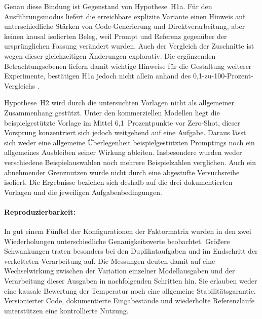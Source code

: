 Genau diese Bindung ist Gegenstand von Hypothese~H1a. Für den Ausführungsmodus liefert die erreichbare explizite Variante einen Hinweis auf unterschiedliche Stärken von Code-Generierung und Direktverarbeitung, aber keinen kausal isolierten Beleg, weil Prompt und Referenz gegenüber der ursprünglichen Fassung verändert wurden. Auch der Vergleich der Zuschnitte ist wegen dieser gleichzeitigen Änderungen explorativ. Die ergänzenden Betrachtungsebenen liefern damit wichtige Hinweise für die Gestaltung weiterer Experimente, bestätigen H1a jedoch nicht allein anhand des 0,1-zu-100-Prozent-Vergleichs \autocite{khanOverviewETLTechniques2024,walhaDataIntegrationTraditional2024}.

Hypothese~H2 wird durch die untersuchten Vorlagen nicht als allgemeiner Zusammenhang gestützt. Unter den kommerziellen Modellen liegt die beispielgestützte Vorlage im Mittel 6,1~Prozentpunkte vor Zero-Shot, dieser Vorsprung konzentriert sich jedoch weitgehend auf eine Aufgabe. Daraus lässt sich weder eine allgemeine Überlegenheit beispielgestützten Promptings noch ein allgemeines Ausbleiben seiner Wirkung ableiten. Insbesondere wurden weder verschiedene Beispielauswahlen noch mehrere Beispielzahlen verglichen. Auch ein abnehmender Grenznutzen wurde nicht durch eine abgestufte Versuchsreihe isoliert. Die Ergebnisse beziehen sich deshalb auf die drei dokumentierten Vorlagen und die jeweiligen Aufgabenbedingungen.

\paragraph{Reproduzierbarkeit:} In gut einem Fünftel der Konfigurationen der Faktormatrix wurden in den zwei Wiederholungen unterschiedliche Genauigkeitswerte beobachtet. Größere Schwankungen traten besonders bei den Duplikataufgaben und im Endschritt der verketteten Verarbeitung auf. Die Messungen deuten damit auf eine Wechselwirkung zwischen der Variation einzelner Modellausgaben und der Verarbeitung dieser Ausgaben in nachfolgenden Schritten hin. Sie erlauben weder eine kausale Bewertung der Temperatur noch eine allgemeine Stabilitätsgarantie. Versionierter Code, dokumentierte Eingabestände und wiederholte Referenzläufe unterstützen eine kontrollierte Nutzung.